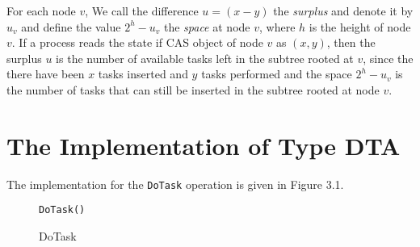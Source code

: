 
For each node $v$, We call the difference $u = (x - y)$ the \emph{surplus} and denote it by $u_v$ and define the value $2^h - u_v$
the \emph{space} at node $v$, where $h$ is the height of node $v$. If a process reads the state
if CAS object of node $v$ as $(x ,y)$, then the surplus $u$ is the number of available tasks left in the subtree rooted at $v$,
since the there have been $x$ tasks inserted and $y$ tasks performed and the space $2^h - u_v$ is the number of tasks that can still be
inserted in the subtree rooted at node $v$.


\section{The Implementation of Type DTA}

The implementation for the \texttt{DoTask} operation is given in Figure 3.1.

\begin{figure}[h]
\begin{algorithm}[H]
\caption{\texttt{DoTask()}}
\end{algorithm}
\caption{DoTask}
\end{figure}



